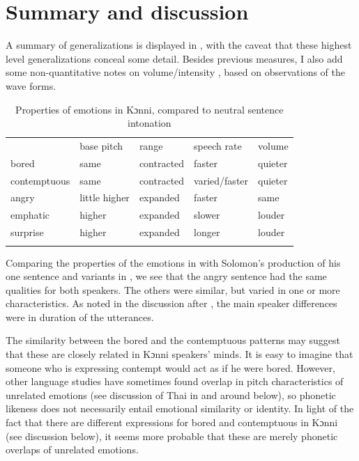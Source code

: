 \documentclass[output=paper]{langsci/langscibook}
\begin{document}
\section{Summary and discussion}

A summary of generalizations is displayed in , with the caveat that these highest level generalizations conceal some detail. Besides previous measures, I also add some non-quantitative notes on volume/intensity , based on observations of the wave forms. 


\begin{table}
\begin{tabular}{lllll} & base pitch & range & speech rate & volume\\
\lsptoprule
bored & same & contracted & faster & quieter\\
contemptuous & same & contracted & varied/faster & quieter\\
angry & little higher & expanded & faster & same\\
emphatic & higher & expanded & slower & louder\\
surprise & higher & expanded & longer & louder\\
\lspbottomrule
\end{tabular}

\caption{Properties of emotions in Kɔnni, compared to neutral sentence intonation}
\label{tab:5.cahill}

\end{table}


Comparing the properties of the emotions in  with Solomon's production of his one sentence and variants in , we see that the angry sentence had the same qualities for both speakers. The others were similar, but varied in one or more characteristics. As noted in the discussion after , the main speaker differences were in duration of the utterances.

The similarity between the bored and the contemptuous patterns may suggest that these are closely related in Kɔnni speakers' minds. It is easy to imagine that someone who is expressing contempt would act as if he were bored. However, other language studies have sometimes found overlap in pitch characteristics of unrelated emotions (see discussion of Thai in and around  below), so phonetic likeness does not necessarily entail emotional similarity or identity. In light of the fact that there are different expressions for bored and contemptuous in Kɔnni (see discussion below), it seems more probable that these are merely phonetic overlaps of unrelated emotions.
\end{document}
